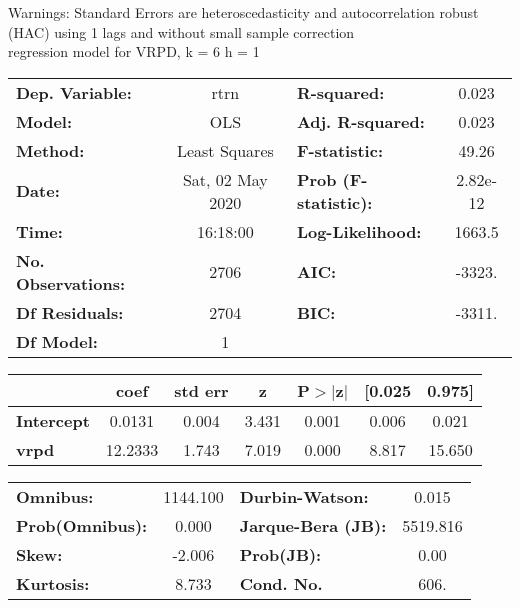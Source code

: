 Warnings: \newline
 [1] Standard Errors are heteroscedasticity and autocorrelation robust (HAC) using 1 lags and without small sample correction\\ 

regression model for VRPD, k = 6 h = 1\begin{center}
\begin{tabular}{lclc}
\toprule
\textbf{Dep. Variable:}    &       rtrn       & \textbf{  R-squared:         } &     0.023   \\
\textbf{Model:}            &       OLS        & \textbf{  Adj. R-squared:    } &     0.023   \\
\textbf{Method:}           &  Least Squares   & \textbf{  F-statistic:       } &     49.26   \\
\textbf{Date:}             & Sat, 02 May 2020 & \textbf{  Prob (F-statistic):} &  2.82e-12   \\
\textbf{Time:}             &     16:18:00     & \textbf{  Log-Likelihood:    } &    1663.5   \\
\textbf{No. Observations:} &        2706      & \textbf{  AIC:               } &    -3323.   \\
\textbf{Df Residuals:}     &        2704      & \textbf{  BIC:               } &    -3311.   \\
\textbf{Df Model:}         &           1      & \textbf{                     } &             \\
\bottomrule
\end{tabular}
\begin{tabular}{lcccccc}
                   & \textbf{coef} & \textbf{std err} & \textbf{z} & \textbf{P$> |$z$|$} & \textbf{[0.025} & \textbf{0.975]}  \\
\midrule
\textbf{Intercept} &       0.0131  &        0.004     &     3.431  &         0.001        &        0.006    &        0.021     \\
\textbf{vrpd}      &      12.2333  &        1.743     &     7.019  &         0.000        &        8.817    &       15.650     \\
\bottomrule
\end{tabular}
\begin{tabular}{lclc}
\textbf{Omnibus:}       & 1144.100 & \textbf{  Durbin-Watson:     } &    0.015  \\
\textbf{Prob(Omnibus):} &   0.000  & \textbf{  Jarque-Bera (JB):  } & 5519.816  \\
\textbf{Skew:}          &  -2.006  & \textbf{  Prob(JB):          } &     0.00  \\
\textbf{Kurtosis:}      &   8.733  & \textbf{  Cond. No.          } &     606.  \\
\bottomrule
\end{tabular}
\end{center}

